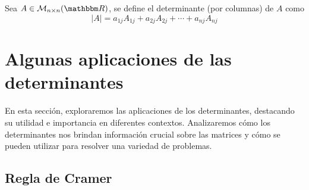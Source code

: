 \begin{definition}
    Sea $A \in \mathcal{M}_{n \times n}(\RR)$, se define el determinante (por columnas) de $A$ como
    $$|A| = a_{1j}A_{1j} + a_{2j}A_{2j} + \cdots + a_{nj}A_{nj}$$
\end{definition}

\section{Algunas aplicaciones de las determinantes}

En esta sección, exploraremos las aplicaciones de los determinantes, destacando su utilidad e importancia en diferentes contextos. Analizaremos cómo los determinantes nos brindan información crucial sobre las matrices y cómo se pueden utilizar para resolver una variedad de problemas.

\subsection{Regla de Cramer}

